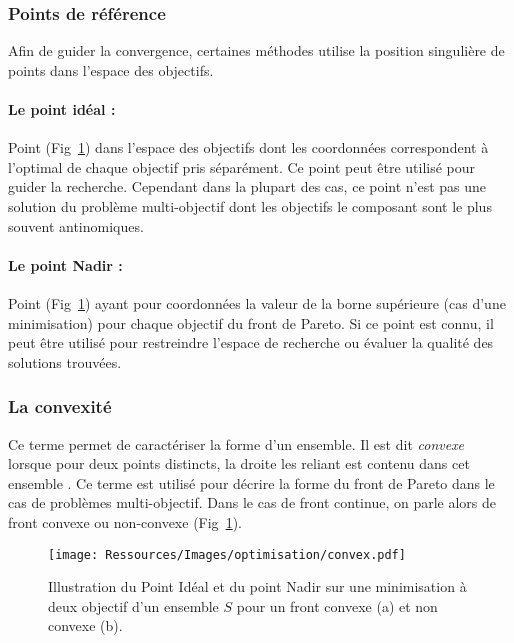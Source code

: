 \subsubsection{Points de référence} %
\label{ssub:points_de_reference}
Afin de guider la convergence, certaines méthodes utilise la position singulière
de points dans l’espace des objectifs.
\paragraph{Le point idéal :} %
\label{par:le_point_idéal}
Point (Fig~\ref{fig:convex_nadir}) dans l’espace des objectifs dont les coordonnées
correspondent à l’optimal de chaque objectif pris séparément. Ce point peut être utilisé
pour guider la recherche. Cependant dans la plupart des cas, ce point n’est pas une
solution du problème multi-objectif dont les objectifs le composant sont le plus souvent
antinomiques.

\paragraph{Le point Nadir :} %
\label{par:le_point_nadir}
Point (Fig~\ref{fig:convex_nadir}) ayant pour coordonnées la valeur de la borne
supérieure (cas d’une minimisation) pour chaque objectif du front de Pareto. Si ce point
est connu, il peut être utilisé pour restreindre l’espace de recherche ou évaluer la
qualité des solutions trouvées.


\subsubsection{La convexité} %
\label{ssub:la_convexite}
Ce terme permet de caractériser la forme d’un ensemble.
Il est dit \emph{convexe} lorsque pour deux points distincts, la droite les reliant est
contenu dans cet ensemble \parencite{Collette2002}. Ce terme est utilisé pour décrire la
forme du front de Pareto dans le cas de problèmes multi-objectif. Dans le cas de front
continue, on parle alors de front convexe ou non-convexe (Fig~\ref{fig:convex_nadir}).

\begin{figure}
    \begin{center}
        \texttt{[image: Ressources/Images/optimisation/convex.pdf]}
    \end{center}
    \caption{Illustration du Point Idéal et du point Nadir sur une minimisation
             à deux objectif d’un ensemble $S$ pour un front convexe (a) et non convexe (b).
             \label{fig:convex_nadir}}
\end{figure}



